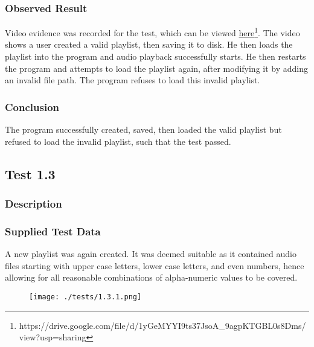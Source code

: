 \subsubsection{Observed Result}
Video evidence was recorded for the test, which can be viewed \href{https://drive.google.com/file/d/1yGeMYYI9ts37JsoA_9agpKTGBL0s8Dms/view?usp=sharing}{here}\footnote{
	https://drive.google.com/file/d/1yGeMYYI9ts37JsoA\_9agpKTGBL0s8Dms/view?usp=sharing
}.  The video shows a user created a valid playlist, then saving it to disk. He then loads the playlist into the program and audio playback successfully starts. He then restarts the program and attempts to load the playlist again, after modifying it by adding an invalid file path. The program refuses to load this invalid playlist.

\subsubsection{Conclusion}
The program successfully created, saved, then loaded the valid playlist but refused to load the invalid playlist, such that the test passed.

\pagebreak
\subsection{Test 1.3}
\subsubsection{Description}
\paragraph{}
{
	\centering
}

\subsubsection{Supplied Test Data}
A new playlist was again created. It was deemed suitable as it contained audio files starting with upper case letters, lower case letters, and even numbers, hence allowing for all reasonable combinations of alpha-numeric values to be covered.
\begin{figure}[H]
	\texttt{[image: ./tests/1.3.1.png]}
\end{figure}

